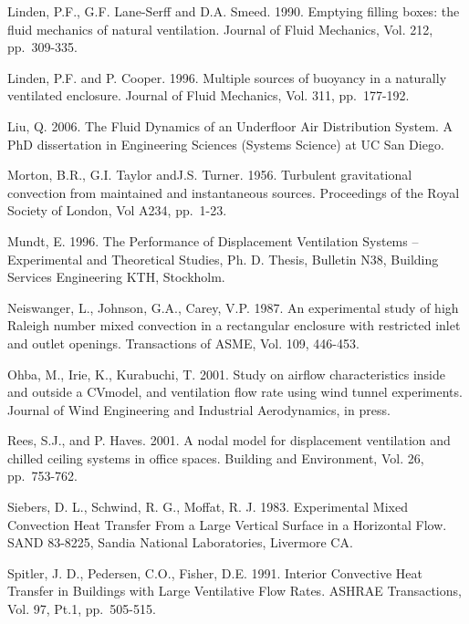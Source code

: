Linden, P.F., G.F. Lane-Serff and D.A. Smeed. 1990. Emptying filling boxes: the fluid mechanics of natural ventilation. Journal of Fluid Mechanics, Vol. 212, pp.~309-335.

Linden, P.F. and P. Cooper. 1996. Multiple sources of buoyancy in a naturally ventilated enclosure. Journal of Fluid Mechanics, Vol. 311, pp.~177-192.

Liu, Q. 2006. The Fluid Dynamics of an Underfloor Air Distribution System. A PhD dissertation in Engineering Sciences (Systems Science) at UC San Diego.

Morton, B.R., G.I. Taylor andJ.S. Turner. 1956. Turbulent gravitational convection from maintained and instantaneous sources. Proceedings of the Royal Society of London, Vol A234, pp.~1-23.

Mundt, E. 1996. The Performance of Displacement Ventilation Systems -- Experimental and Theoretical Studies, Ph. D. Thesis, Bulletin N38, Building Services Engineering KTH, Stockholm.

Neiswanger, L., Johnson, G.A., Carey, V.P. 1987. An experimental study of high Raleigh number mixed convection in a rectangular enclosure with restricted inlet and outlet openings. Transactions of ASME, Vol. 109, 446-453.

Ohba, M., Irie, K., Kurabuchi, T. 2001. Study on airflow characteristics inside and outside a CVmodel, and ventilation flow rate using wind tunnel experiments. Journal of Wind Engineering and Industrial Aerodynamics, in press.

Rees, S.J., and P. Haves. 2001. A nodal model for displacement ventilation and chilled ceiling systems in office spaces. Building and Environment, Vol. 26, pp.~753-762.

Siebers, D. L., Schwind, R. G., Moffat, R. J. 1983. Experimental Mixed Convection Heat Transfer From a Large Vertical Surface in a Horizontal Flow. SAND 83-8225, Sandia National Laboratories, Livermore CA.

Spitler, J. D., Pedersen, C.O., Fisher, D.E. 1991. Interior Convective Heat Transfer in Buildings with Large Ventilative Flow Rates. ASHRAE Transactions, Vol. 97, Pt.1, pp.~505-515.



